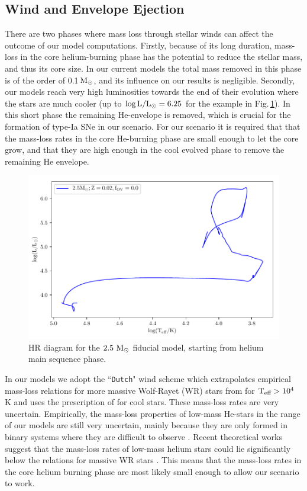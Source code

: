 \documentclass[../../main/thesis_msc.tex]{subfiles}
\begin{document}
    \subsection{Wind and Envelope Ejection} \label{sec:wind}
There are two phases where mass loss through stellar winds can affect the outcome of our model computations. Firstly, because of its long duration, mass-loss in the core helium-burning phase has the potential to reduce the stellar mass, and thus its core size. In our current models the total mass removed in this phase is of the order of 0.1\,$\rm M_\odot$, and its influence on our results is negligible. Secondly, our models reach very high luminosities towards the end of their evolution where the stars are much cooler (up to $\rm \log{L/L_\odot = 6.25}$ for the example in Fig.\,\ref{fig:HRD}). In this short phase the remaining He-envelope is removed, which is crucial for the formation of type-Ia SNe in our scenario. For our scenario it is required that that the mass-loss rates in the core He-burning phase are small enough to let the core grow, and that they are high enough in the cool evolved phase to remove the remaining He envelope.

    \begin{figure}[h!]
        \centering
        \includegraphics[width=0.6\columnwidth]{../figures/chapter4/HRD.pdf}
        \caption{HR diagram for the $\rm 2.5 \ M_{\odot}$ fiducial model, starting from helium main sequence phase.}
        \label{fig:HRD}
    \end{figure}


In our models we adopt the ``\texttt{Dutch}" \mesa wind scheme which extrapolates empirical mass-loss relations for more massive Wolf-Rayet (WR) stars from \cite{Nugis2000} for $\rm T_{\text{eff}} > 10^4$ K and uses the prescription of \cite{deJager1988} for cool stars. These mass-loss rates are very uncertain. Empirically, the mass-loss properties of low-mass He-stars in the range of our models are still very uncertain, mainly because they are only formed in binary systems where they are difficult to observe \citep{Smith2017,Zapartas2017}. Recent theoretical works suggest that the mass-loss rates of low-mass helium stars could lie significantly below the relations for massive WR stars \citep{Graefener2017,Vink2017}. This means that the mass-loss rates in the core helium burning phase are most likely small enough to allow our scenario to work.
        
\end{document}
